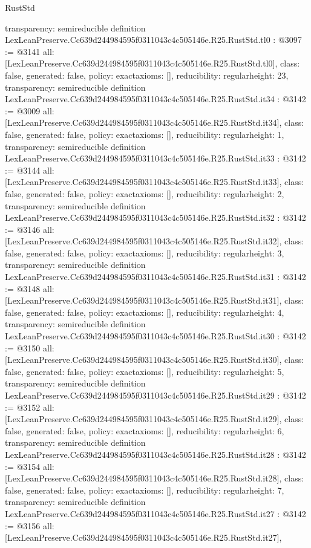 \begin{lexlean}{RustStd}
\begin{coremodule}
{  transparency: semireducible
}
definition LexLeanPreserve.Cc639d244984595f0311043c4c505146e.R25.RustStd.tl0 : @3097 := @3141 {
  all: [LexLeanPreserve.Cc639d244984595f0311043c4c505146e.R25.RustStd.tl0],
  class: false,
  generated: false,
  policy: exact{axioms: []},
  reducibility: regular{height: 23},
  transparency: semireducible
}
definition LexLeanPreserve.Cc639d244984595f0311043c4c505146e.R25.RustStd.it34 : @3142 := @3009 {
  all: [LexLeanPreserve.Cc639d244984595f0311043c4c505146e.R25.RustStd.it34],
  class: false,
  generated: false,
  policy: exact{axioms: []},
  reducibility: regular{height: 1},
  transparency: semireducible
}
definition LexLeanPreserve.Cc639d244984595f0311043c4c505146e.R25.RustStd.it33 : @3142 := @3144 {
  all: [LexLeanPreserve.Cc639d244984595f0311043c4c505146e.R25.RustStd.it33],
  class: false,
  generated: false,
  policy: exact{axioms: []},
  reducibility: regular{height: 2},
  transparency: semireducible
}
definition LexLeanPreserve.Cc639d244984595f0311043c4c505146e.R25.RustStd.it32 : @3142 := @3146 {
  all: [LexLeanPreserve.Cc639d244984595f0311043c4c505146e.R25.RustStd.it32],
  class: false,
  generated: false,
  policy: exact{axioms: []},
  reducibility: regular{height: 3},
  transparency: semireducible
}
definition LexLeanPreserve.Cc639d244984595f0311043c4c505146e.R25.RustStd.it31 : @3142 := @3148 {
  all: [LexLeanPreserve.Cc639d244984595f0311043c4c505146e.R25.RustStd.it31],
  class: false,
  generated: false,
  policy: exact{axioms: []},
  reducibility: regular{height: 4},
  transparency: semireducible
}
definition LexLeanPreserve.Cc639d244984595f0311043c4c505146e.R25.RustStd.it30 : @3142 := @3150 {
  all: [LexLeanPreserve.Cc639d244984595f0311043c4c505146e.R25.RustStd.it30],
  class: false,
  generated: false,
  policy: exact{axioms: []},
  reducibility: regular{height: 5},
  transparency: semireducible
}
definition LexLeanPreserve.Cc639d244984595f0311043c4c505146e.R25.RustStd.it29 : @3142 := @3152 {
  all: [LexLeanPreserve.Cc639d244984595f0311043c4c505146e.R25.RustStd.it29],
  class: false,
  generated: false,
  policy: exact{axioms: []},
  reducibility: regular{height: 6},
  transparency: semireducible
}
definition LexLeanPreserve.Cc639d244984595f0311043c4c505146e.R25.RustStd.it28 : @3142 := @3154 {
  all: [LexLeanPreserve.Cc639d244984595f0311043c4c505146e.R25.RustStd.it28],
  class: false,
  generated: false,
  policy: exact{axioms: []},
  reducibility: regular{height: 7},
  transparency: semireducible
}
definition LexLeanPreserve.Cc639d244984595f0311043c4c505146e.R25.RustStd.it27 : @3142 := @3156 {
  all: [LexLeanPreserve.Cc639d244984595f0311043c4c505146e.R25.RustStd.it27],
}
\end{coremodule}
\end{lexlean}
